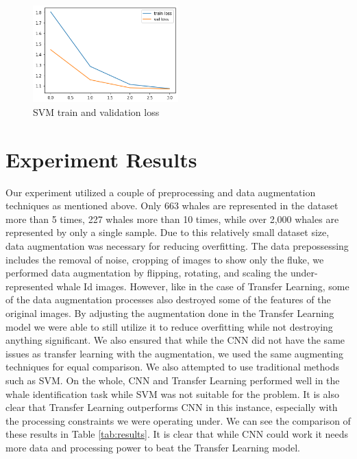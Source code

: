 \documentclass[paper=a4, fontsize=11pt]{scrartcl}
\numberwithin{equation}{section}		%
\numberwithin{table}{section}				%
\begin{document}
\begin{figure}[!h]
    \centering
    \includegraphics[width=0.5\textwidth]{svm_train_val_loss.png}
    \caption{SVM train and validation loss}
    \label{fig:TLLOSS5}
\end{figure}



\section{Experiment Results}\label{sec: experiment}
Our experiment utilized a couple of preprocessing and data augmentation techniques as mentioned above. Only 663 whales are represented in the dataset more than 5 times, 227 whales more than 10 times, while over 2,000 whales are represented by only a single sample. Due to this relatively small dataset size, data augmentation was necessary for reducing overfitting. The data prepossessing includes the removal of noise, cropping of images to show only the fluke, we performed data augmentation by flipping, rotating, and scaling the under-represented whale Id images. However, like in the case of Transfer Learning, some of the data augmentation processes also destroyed some of the features of the original images. By adjusting the augmentation done in the Transfer Learning model we were able to still utilize it to reduce overfitting while not destroying anything significant. We also ensured that while the CNN did not have the same issues as transfer learning with the augmentation, we used the same augmenting techniques for equal comparison. We also attempted to use traditional methods such as SVM. On the whole, CNN and Transfer Learning performed well in the whale identification task while SVM was not suitable for the problem. It is also clear that Transfer Learning outperforms CNN in this instance, especially with the processing constraints we were operating under. We can see the comparison of these results in Table \ref{tab:results}. It is clear that while CNN could work it needs more data and processing power to beat the Transfer Learning model.
\end{document}
